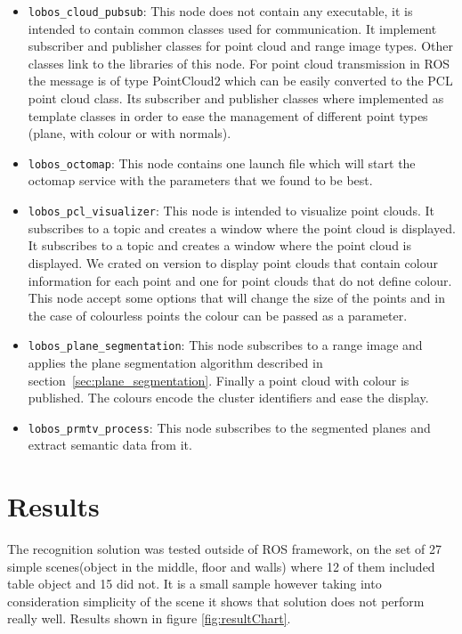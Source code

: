 \documentclass[fontsize=12pt]{article}
\begin{document}
\begin{itemize}
    \item \verb|lobos_cloud_pubsub|: This node does not contain any executable, it is intended to contain common classes used for communication. It implement subscriber and publisher classes for point cloud and range image types. Other classes link to the libraries of this node. For point cloud transmission in ROS the message is of type PointCloud2 which can be easily converted to the PCL point cloud class. Its subscriber and publisher classes where implemented as template classes in order to ease the management of different point types (plane, with colour or with normals). 

    \item \verb|lobos_octomap|: This node contains one launch file which will start the octomap service with the parameters that we found to be best.

    \item \verb|lobos_pcl_visualizer|: This node is intended to visualize point clouds. It subscribes to a topic and creates a window where the point cloud is displayed. It subscribes to a topic and creates a window where the point cloud is displayed. We crated on version to display point clouds that contain colour information for each point and one for point clouds that do not define colour. This node accept some options that will change the size of the points and in the case of colourless points the colour can be passed as a parameter.

    \item \verb|lobos_plane_segmentation|: This node subscribes to a range image and applies the plane segmentation algorithm described in section~\ref{sec:plane_segmentation}. Finally a point cloud with colour is published. The colours encode the cluster identifiers and ease the display.

    \item \verb|lobos_prmtv_process|: This node subscribes to the segmented planes and extract semantic data from it.
\end{itemize}

\section{Results}
The recognition solution was tested outside of ROS framework, on the set of 27 simple scenes(object in the middle, floor and walls) where 12 of them included table object and 15 did not. It is a small sample however taking into consideration simplicity of the scene it shows that solution does not perform really well. Results shown in figure \ref{fig:resultChart}.
\end{document}
